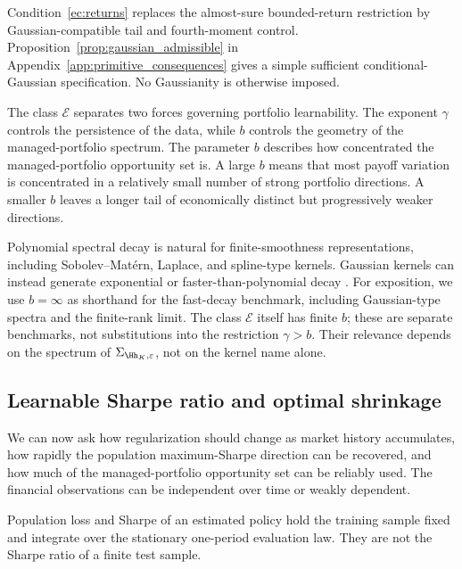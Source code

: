 Condition~\ref{ec:returns} replaces the almost-sure bounded-return restriction
by Gaussian-compatible tail and fourth-moment control. Proposition~\ref{prop:gaussian_admissible}
in Appendix~\ref{app:primitive_consequences} gives a simple sufficient
conditional-Gaussian specification. No Gaussianity is otherwise imposed.

The class $\mathcal E$ separates two forces governing portfolio learnability.
The exponent $\gamma$ controls the persistence of the data, while $b$ controls
the geometry of the managed-portfolio spectrum.
The parameter $b$ describes how concentrated the managed-portfolio opportunity
set is. A large $b$ means that most payoff variation is concentrated in a
relatively small number of strong portfolio directions. A smaller $b$ leaves a
longer tail of economically distinct but progressively weaker directions.

Polynomial spectral decay is natural for finite-smoothness representations,
including Sobolev--Mat\'ern, Laplace, and spline-type kernels. Gaussian kernels
can instead generate exponential or faster-than-polynomial decay
\citep{belkin2018}. For exposition, we use $b=\infty$ as shorthand for the
fast-decay benchmark, including Gaussian-type spectra and the finite-rank
limit. The class $\mathcal E$ itself has finite $b$; these are separate
benchmarks, not substitutions into the restriction $\gamma>b$.
Their relevance depends on the spectrum of $\Sigma_{\Hh_K,\varepsilon}$,
not on the kernel name alone.

\subsection{Learnable Sharpe ratio and optimal shrinkage}

We can now ask how regularization should change as market history accumulates,
how rapidly the population maximum-Sharpe direction can be recovered, and how
much of the managed-portfolio opportunity set can be reliably used. The financial observations can be 
independent over time or weakly dependent.

Population loss and Sharpe of an estimated policy hold the training sample
fixed and integrate over the stationary one-period evaluation law. They are
not the Sharpe ratio of a finite test sample.

